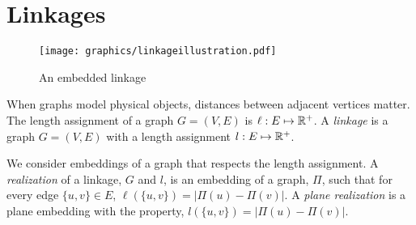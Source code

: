 \section{Linkages}
\begin{figure}[h]
 \begin{center}
  \texttt{[image: graphics/linkageillustration.pdf]}
  \caption{An embedded linkage}
 \end{center}

\end{figure}

When graphs model physical objects, distances between adjacent vertices matter. The length 
assignment of a graph $G=(V,E)$ is $\ell:E \mapsto {\mathbb{R}}^+$. A \textit{linkage} is a graph $G = 
(V,E)$ with a length assignment $l:E \mapsto {\mathbb{R}}^+$.  

We consider embeddings of a graph that 
respects the length assignment.  A \textit{realization} of a linkage, $G$ and $l$, is an embedding 
of a graph, $\Pi$, such that for every edge $\{u,v\} \in E$, $\ell\left( \{u,v\} \right) 
= \left\vert \Pi(u) - \Pi(v) \right\vert$.  A \textit{plane realization} is a 
plane embedding with the property, $l\left( \{u,v\} \right) 
= \left\vert \Pi(u) - \Pi(v) \right\vert$.




